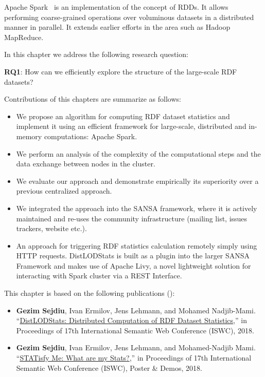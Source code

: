 Apache Spark~ is an implementation of the concept of \gls{RDD}s.
It allows performing coarse-grained operations over voluminous datasets in a distributed manner in parallel.
It extends earlier efforts in the area such as Hadoop MapReduce.


In this chapter we address the following research question:
\begin{tcolorbox}
\textbf{RQ1}: How can we efficiently explore the structure of the large-scale RDF datasets?
\end{tcolorbox}

Contributions of this chapters are summarize as follows:
\begin{itemize}
    \item We propose an algorithm for computing RDF dataset statistics and implement it using an efficient framework for large-scale, distributed and in-memory computations: Apache Spark.
    \item We perform an analysis of the complexity of the computational steps and the data exchange between nodes in the cluster. 
    \item We evaluate our approach and demonstrate empirically its superiority over a previous centralized approach.
    \item We integrated the approach into the SANSA framework, where it is actively maintained and re-uses the community infrastructure (mailing list, issues trackers, website etc.).
    \item An approach for triggering RDF statistics calculation remotely simply using HTTP requests. 
    DistLODStats is built as a plugin into the larger SANSA Framework and makes use of Apache Livy, a novel lightweight solution for interacting with Spark cluster via a REST Interface.
\end{itemize}

This chapter is based on the following publications (\cite{sejdiu-2018-dist-lod-stats-iswc,sejdiu-2018-statisfy-iswc-poster}):
\begin{itemize}
    \item \textbf{Gezim Sejdiu}, Ivan Ermilov, Jens Lehmann, and Mohamed Nadjib-Mami. “\href{http://jens-lehmann.org/files/2018/iswc_distlodstats.pdf}{DistLODStats: Distributed Computation of RDF Dataset Statistics},” in Proceedings of 17th International Semantic Web Conference (ISWC), 2018.
   
    \item \textbf{Gezim Sejdiu}, Ivan Ermilov, Jens Lehmann, and Mohamed-Nadjib Mami. “\href{http://jens-lehmann.org/files/2018/iswc_statisfy_pd.pdf}{STATisfy Me: What are my Stats?},” in Proceedings of 17th International Semantic Web Conference (ISWC), Poster \& Demos, 2018.
\end{itemize}

